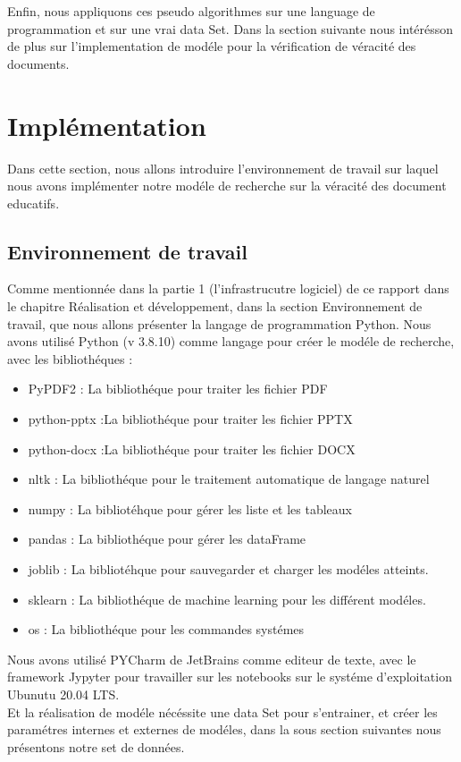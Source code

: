 \documentclass[12pt]{report}
\begin{document}
Enfin, nous appliquons ces pseudo algorithmes sur une language de programmation et sur une vrai data Set. Dans la section suivante nous intérésson de plus sur l'implementation de modéle pour la vérification de véracité des documents.

\section{Implémentation}
Dans cette section, nous allons introduire l'environnement de travail sur laquel nous avons implémenter notre modéle de recherche sur la véracité des document educatifs.

\subsection{Environnement de travail}
Comme mentionnée dans la partie 1 (l'infrastrucutre logiciel) de ce rapport dans le chapitre Réalisation et développement, dans la section Environnement de travail, que nous allons présenter la langage de programmation Python.
Nous avons utilisé Python (v 3.8.10) comme langage pour créer le modéle de recherche, avec les bibliothéques : 
\begin{itemize}
\item PyPDF2 : La bibliothéque pour traiter les fichier PDF
\item python-pptx :La bibliothéque pour traiter les fichier PPTX
\item python-docx :La bibliothéque pour traiter les fichier DOCX
\item nltk : La bibliothéque pour le traitement automatique de langage naturel 
\item numpy : La bibliotéhque pour gérer les liste et les tableaux
\item pandas : La bibliothéque pour gérer les dataFrame
\item joblib : La bibliotéhque pour sauvegarder et charger les modéles atteints.
\item sklearn : La bibliothéque de machine learning pour les différent modéles.
\item os : La bibliothéque pour les commandes systémes
\end{itemize}


Nous avons utilisé PYCharm de JetBrains comme editeur de texte, avec le framework Jypyter pour travailler sur les notebooks sur le systéme d'exploitation Ubunutu 20.04 LTS.
\\
Et la réalisation de modéle nécéssite une data Set pour s'entrainer, et créer les paramétres internes et externes de modéles, dans la sous section suivantes nous présentons notre set de données.
\end{document}
